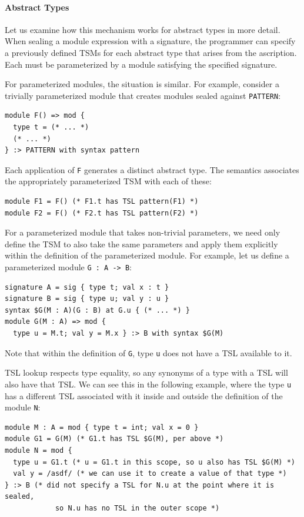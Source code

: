 \paragraph{Abstract Types}
Let us examine how this mechanism works for abstract types in more detail. When sealing a module expression with a signature, the programmer can specify a previously defined TSMs for each abstract type that arises from the ascription. Each must be parameterized by a module satisfying the specified signature.

For parameterized modules, the situation is similar. For example, consider a trivially parameterized module that creates modules sealed against \lstinline{PATTERN}:
\begin{lstlisting}[numbers=none]
module F() => mod {
  type t = (* ... *)
  (* ... *)
} :> PATTERN with syntax pattern 
\end{lstlisting}
Each application of \lstinline{F} generates a distinct abstract type. The semantics associates the appropriately parameterized TSM with each of these:
\begin{lstlisting}[numbers=none]
module F1 = F() (* F1.t has TSL pattern(F1) *)
module F2 = F() (* F2.t has TSL pattern(F2) *)
\end{lstlisting}

For a parameterized module that takes non-trivial parameters, we need only define the TSM to also take the same parameters and apply them explicitly within the definition of the parameterized module. For example, let us define a parameterized module \lstinline{G : A -> B}:
\begin{lstlisting}[numbers=none,mathescape=|]
signature A = sig { type t; val x : t }
signature B = sig { type u; val y : u }
syntax $G(M : A)(G : B) at G.u { (* ... *) }
module G(M : A) => mod { 
  type u = M.t; val y = M.x } :> B with syntax $G(M)
\end{lstlisting}
Note that within the definition of \lstinline{G}, type \lstinline{u} does not have a TSL available to it.

TSL lookup respects type equality, so any synonyms of a type with a TSL will also have that TSL. We can see this in the following example, where the type \lstinline{u} has a different TSL associated with it inside and outside the definition of the module \lstinline{N}:
\begin{lstlisting}[numbers=none,mathescape=|]
module M : A = mod { type t = int; val x = 0 }
module G1 = G(M) (* G1.t has TSL $G(M), per above *)
module N = mod { 
  type u = G1.t (* u = G1.t in this scope, so u also has TSL $G(M) *)
  val y = /asdf/ (* we can use it to create a value of that type *) 
} :> B (* did not specify a TSL for N.u at the point where it is sealed, 
            so N.u has no TSL in the outer scope *)
\end{lstlisting}

